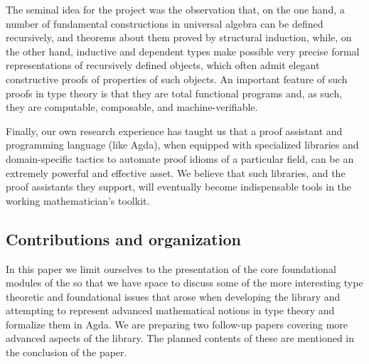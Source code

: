 \documentclass[a4paper,UKenglish,cleveref,autoref,thm-restate,11pt]{lipics-v2021}
\begin{document}
The seminal idea for the \agdaualib project was the observation that, on the one hand, a number of fundamental constructions in universal algebra can be defined recursively, and theorems about them proved by structural induction, while, on the other hand, inductive and dependent types make possible very precise formal representations of recursively defined objects, which often admit elegant constructive proofs of properties of such objects.  An important feature of such proofs in type theory is that they are total functional programs and, as such, they are computable, composable, and machine-verifiable.

Finally, our own research experience has taught us that a proof assistant and programming language (like Agda), when equipped with specialized libraries and domain-specific tactics to automate proof idioms of a particular field, can be an extremely powerful and effective asset. We believe that such libraries, and the proof assistants they support, will eventually become indispensable tools in the working mathematician's toolkit.



\subsection{Contributions and organization}
\label{sec:contributions}

In this paper we limit ourselves to the presentation of the core foundational modules of the \ualib so that we have space to discuss some of the more interesting type theoretic and foundational issues that arose when developing the library and attempting to represent advanced mathematical notions in type theory and formalize them in Agda.
We are preparing two follow-up papers covering more advanced aspects of the library. The planned contents of these are mentioned in the conclusion of the paper.
\end{document}
